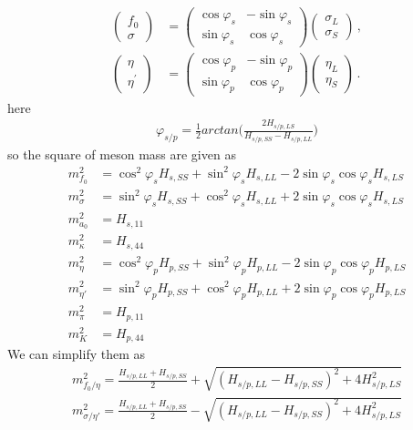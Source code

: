 \documentclass[12pt]{article}
\begin{document}
\begin{align}\label{eq:plstrafo}
\begin{pmatrix}f_0 \\ \sigma \end{pmatrix} &= \begin{pmatrix} \cos\varphi_s & - \sin\varphi_s \\ \sin\varphi_s & \cos\varphi_s \end{pmatrix} \begin{pmatrix}\sigma_L \\ \sigma_S \end{pmatrix}\,,\\
\begin{pmatrix}\eta \\ \eta^\prime \end{pmatrix} &= \begin{pmatrix} \cos\varphi_p & - \sin\varphi_p \\ \sin\varphi_p & \cos\varphi_p \end{pmatrix} \begin{pmatrix}\eta_L \\ \eta_S \end{pmatrix}\,.
\end{align}
here
\begin{align}
\varphi_{s/p}=\frac{1}{2} arctan\Bigg(\frac{2H_{s/p,LS}}{H_{s/p,SS}-H_{s/p,LL}}\Bigg)
\end{align}
so the square of meson mass are given as
\begin{align}
m_{f_0}^2&=\cos^2\varphi_s H_{s,SS}+\sin^2 \varphi_s H_{s,LL}-2 \sin \varphi_s \cos \varphi_s H_{s,LS}\\
m_{\sigma}^2&=\sin^2\varphi_s H_{s,SS}+\cos^2 \varphi_s H_{s,LL}+2 \sin \varphi_s \cos \varphi_s H_{s,LS}\\
m_{a_0}^2&=H_{s,11}\\
m_{\kappa}^2&=H_{s,44}\\
m_{\eta}^2&=\cos^2\varphi_p H_{p,SS}+\sin^2 \varphi_p H_{p,LL}-2 \sin \varphi_p \cos \varphi_p H_{p,LS}\\
m_{\eta'}^2&=\sin^2\varphi_p H_{p,SS}+\cos^2 \varphi_p H_{p,LL}+2 \sin \varphi_p \cos \varphi_p H_{p,LS}\\
m_{\pi}^2&=H_{p,11}\\
m_{K}^2&=H_{p,44}
\end{align}
We can simplify them as
 \begin{align}
m_{f_0/\eta}^2=\frac{H_{s/p,LL}+H_{s/p,SS}}{2}+\sqrt{(H_{s/p,LL}-H_{s/p,SS})^2+4 H_{s/p,LS}^2}\\
m_{\sigma/\eta'}^2=\frac{H_{s/p,LL}+H_{s/p,SS}}{2}-\sqrt{(H_{s/p,LL}-H_{s/p,SS})^2+4 H_{s/p,LS}^2}
\end{align}
\end{document}
